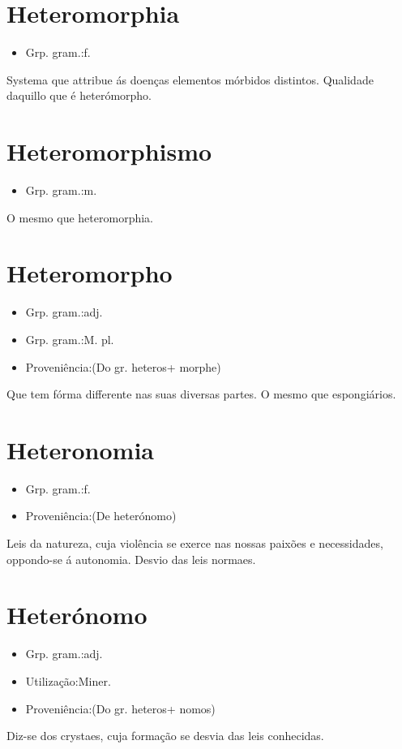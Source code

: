 \documentclass{article}
\begin{document}
\section{Heteromorphia}
\begin{itemize}
\item {Grp. gram.:f.}
\end{itemize}
Systema que attribue ás doenças elementos mórbidos distintos.
Qualidade daquillo que é heterómorpho.
\section{Heteromorphismo}
\begin{itemize}
\item {Grp. gram.:m.}
\end{itemize}
O mesmo que \textunderscore heteromorphia\textunderscore .
\section{Heteromorpho}
\begin{itemize}
\item {Grp. gram.:adj.}
\end{itemize}
\begin{itemize}
\item {Grp. gram.:M. pl.}
\end{itemize}
\begin{itemize}
\item {Proveniência:(Do gr. \textunderscore heteros\textunderscore  + \textunderscore morphe\textunderscore )}
\end{itemize}
Que tem fórma differente nas suas diversas partes.
O mesmo que \textunderscore espongiários\textunderscore .
\section{Heteronomia}
\begin{itemize}
\item {Grp. gram.:f.}
\end{itemize}
\begin{itemize}
\item {Proveniência:(De \textunderscore heterónomo\textunderscore )}
\end{itemize}
Leis da natureza, cuja violência se exerce nas nossas paixões e necessidades, oppondo-se á autonomia.
Desvio das leis normaes.
\section{Heterónomo}
\begin{itemize}
\item {Grp. gram.:adj.}
\end{itemize}
\begin{itemize}
\item {Utilização:Miner.}
\end{itemize}
\begin{itemize}
\item {Proveniência:(Do gr. \textunderscore heteros\textunderscore  + \textunderscore nomos\textunderscore )}
\end{itemize}
Diz-se dos crystaes, cuja formação se desvia das leis conhecidas.
\end{document}
